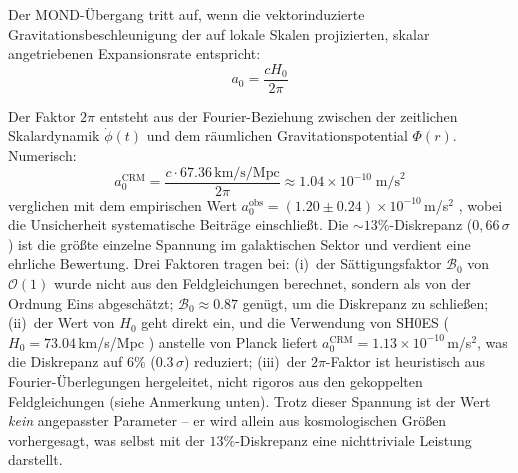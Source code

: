 \documentclass[aps,prd,twocolumn,superscriptaddress,nofootinbib]{revtex4-2}
\begin{document}
Der MOND-\"Ubergang tritt auf, wenn die vektorinduzierte Gravitationsbeschleunigung der auf lokale Skalen projizierten, skalar angetriebenen Expansionsrate entspricht:
\begin{equation}
a_0 = \frac{cH_0}{2\pi}
\label{eq:a0}
\end{equation}

Der Faktor $2\pi$ entsteht aus der Fourier-Beziehung zwischen der zeitlichen Skalardynamik $\dot{\phi}(t)$ und dem r\"aumlichen Gravitationspotential $\Phi(r)$. Numerisch:
\begin{equation}
a_0^{\mathrm{CRM}} = \frac{c \cdot 67.36\,\mathrm{km/s/Mpc}}{2\pi} \approx 1.04 \times 10^{-10}\;\mathrm{m/s}^2
\end{equation}
verglichen mit dem empirischen Wert $a_0^{\mathrm{obs}} = (1.20 \pm 0.24) \times 10^{-10}$\,m/s$^2$ \cite{McGaugh2016}, wobei die Unsicherheit systematische Beitr\"age einschlie\ss{}t. Die $\sim 13\%$-Diskrepanz ($0{,}66\,\sigma$) ist die gr\"o\ss{}te einzelne Spannung im galaktischen Sektor und verdient eine ehrliche Bewertung. Drei Faktoren tragen bei: (i)~der S\"attigungsfaktor $\mathcal{B}_0$ von $\mathcal{O}(1)$ wurde nicht aus den Feldgleichungen berechnet, sondern als von der Ordnung Eins abgesch\"atzt; $\mathcal{B}_0 \approx 0.87$ gen\"ugt, um die Diskrepanz zu schlie\ss{}en; (ii)~der Wert von $H_0$ geht direkt ein, und die Verwendung von SH0ES ($H_0 = 73.04$\,km/s/Mpc \cite{Riess2022}) anstelle von Planck liefert $a_0^{\mathrm{CRM}} = 1.13 \times 10^{-10}$\,m/s$^2$, was die Diskrepanz auf $6\%$ ($0.3\,\sigma$) reduziert; (iii)~der $2\pi$-Faktor ist heuristisch aus Fourier-\"Uberlegungen hergeleitet, nicht rigoros aus den gekoppelten Feldgleichungen (siehe Anmerkung unten). Trotz dieser Spannung ist der Wert \textit{kein} angepasster Parameter -- er wird allein aus kosmologischen Gr\"o\ss{}en vorhergesagt, was selbst mit der $13\%$-Diskrepanz eine nichttriviale Leistung darstellt.
\end{document}
